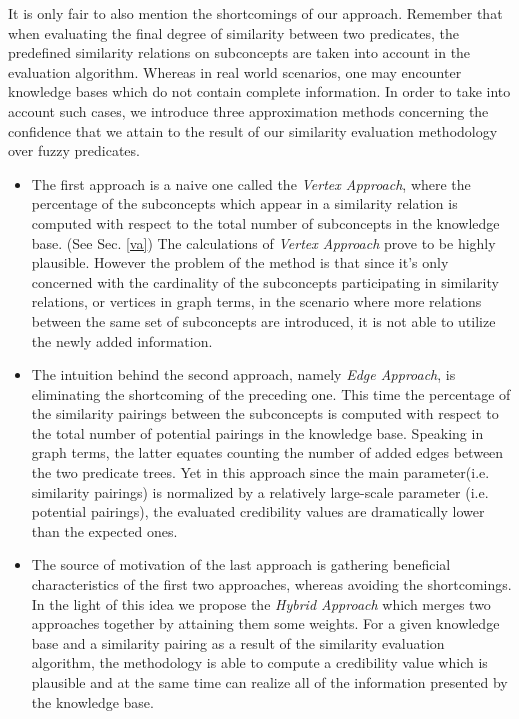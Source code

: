 \documentclass[egilmezThesis.tex]{subfiles}
\begin{document}
It is only fair to also mention the shortcomings of our approach. Remember that when evaluating the final degree of similarity between two predicates, the predefined similarity relations on subconcepts are taken into account in the evaluation algorithm. Whereas in real world scenarios, one may encounter knowledge bases which do not contain complete information. In order to take into account such cases, we introduce three approximation methods concerning the confidence that we attain to the result of our similarity evaluation methodology over fuzzy predicates.
\renewcommand{\labelitemi}{$\bullet$}
\begin{itemize}
\item The first approach is a naive one called the \textit{Vertex Approach}, where the percentage of the subconcepts which appear in a similarity relation is computed with respect to the total number of subconcepts in the knowledge base. (See Sec. \ref{va}) The calculations of \textit{Vertex Approach} prove to be highly plausible. However the problem of the method is that since it's only concerned with the cardinality of the subconcepts participating in similarity relations, or vertices in graph terms, in the scenario where more relations between the same set of subconcepts are introduced, it is not able to utilize the newly added information.
\item The intuition behind the second approach, namely \textit{Edge Approach}, is eliminating the shortcoming of the preceding one. This time the percentage of the similarity pairings between the subconcepts is computed with respect to the total number of potential pairings in the knowledge base. Speaking in graph terms, the latter equates counting the number of added edges between the two predicate trees. Yet in this approach since the main parameter(i.e. similarity pairings) is normalized by a relatively large-scale parameter (i.e. potential pairings), the evaluated credibility values are dramatically lower than the expected ones. 
\item The source of motivation of the last approach is gathering beneficial characteristics of the first two approaches, whereas avoiding the shortcomings. In the light of this idea we propose the \textit{Hybrid Approach} which merges two approaches together by attaining them some weights. For a given knowledge base and a similarity pairing as a result of the similarity evaluation algorithm, the methodology is able to compute a credibility value which is plausible and at the same time can realize all of the information presented by the knowledge base.
\end{itemize}
\end{document}
